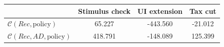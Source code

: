 \begin{tabular}{@{}lccc@{}} 
\toprule 
                          & Stimulus check      & UI extension    & Tax cut    \\  \midrule 
$\mathcal{C}(Rec,\text{policy})$ & 65.227  & -443.560  & -21.012     \\ 
$\mathcal{C}(Rec, AD,\text{policy})$ & 418.791  & -148.089  & 125.399     \\ 
\end{tabular}  
